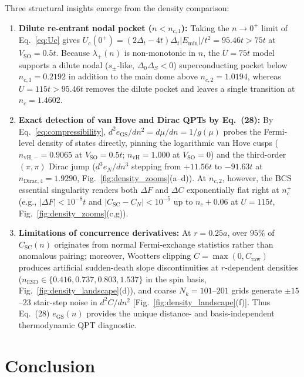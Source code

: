 \documentclass[aps,prb,twocolumn,superscriptaddress,longbibliography,floatfix]{revtex4-2}
\newcommand{\SO}{V_{\mathrm{SO}}}
\begin{document}
Three structural insights emerge from the density comparison:
\begin{enumerate}
\item \textbf{Dilute re-entrant nodal pocket ($n < n_{c,1}$):} Taking the $n\to 0^+$ limit of Eq.~\eqref{eq:Uc} gives $U_c(0^+) = (2\Delta_t - 4t)\Delta_t|E_{\min}|/t^2 = 95.46t > 75t$ at $\SO=0.5t$. Because $\lambda_+(n)$ is non-monotonic in $n$, the $U=75t$ model supports a dilute nodal ($s_\pm$-like, $\Delta_0\Delta_S < 0$) superconducting pocket below $n_{c,1}=0.2192$ in addition to the main dome above $n_{c,2}=1.0194$, whereas $U=115t > 95.46t$ removes the dilute pocket and leaves a single transition at $n_c=1.4602$.
\item \textbf{Exact detection of van Hove and Dirac QPTs by Eq.~(28):} By Eq.~\eqref{eq:compressibility}, $d^2e_{\mathrm{GS}}/dn^2 = d\mu/dn = 1/g(\mu)$ probes the Fermi-level density of states directly, pinning the logarithmic van Hove cusps ($n_{\mathrm{vH},-}=0.9065$ at $\SO=0.5t$; $n_{\mathrm{vH}}=1.000$ at $\SO=0$) and the third-order $(\pi,\pi)$ Dirac jump ($d^3e_N/dn^3$ stepping from $+11.56t$ to $-91.63t$ at $n_{\mathrm{Dirac},4}=1.9290$, Fig.~\ref{fig:density_zooms}(a--d)). At $n_{c,2}$, however, the BCS essential singularity renders both $\Delta F$ and $\Delta C$ exponentially flat right at $n_c^+$ (e.g., $|\Delta F|<10^{-8}t$ and $|C_{\mathrm{SC}}-C_N|<10^{-5}$ up to $n_c+0.06$ at $U=115t$, Fig.~\ref{fig:density_zooms}(c,g)).
\item \textbf{Limitations of concurrence derivatives:} At $r=0.25a$, over $95\%$ of $C_{\mathrm{SC}}(n)$ originates from normal Fermi-exchange statistics rather than anomalous pairing; moreover, Wootters clipping $C=\max(0,C_{\mathrm{raw}})$ produces artificial sudden-death slope discontinuities at $r$-dependent densities ($n_{\mathrm{ESD}}\in\{0.416,0.737,0.803,1.537\}$ in the spin basis, Fig.~\ref{fig:density_landscape}(d)), and coarse $N_k=101$--$201$ grids generate $\pm 15$--$23$ stair-step noise in $d^2C/dn^2$ [Fig.~\ref{fig:density_landscape}(f)]. Thus Eq.~(28) $e_{\mathrm{GS}}(n)$ provides the unique distance- and basis-independent thermodynamic QPT diagnostic.
\end{enumerate}

\section{Conclusion}
\label{sec:conclusion}
\end{document}
